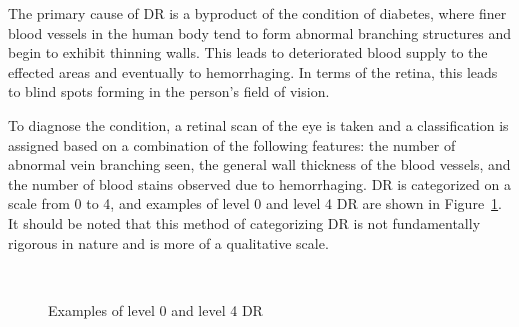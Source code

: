 \documentclass[letterpaper,12pt]{article}
\newcommand{\figref}[1]{Figure~\ref{#1}}
\begin{document}
The primary cause of DR is a byproduct of the condition of diabetes, where finer blood vessels in the human body tend to form abnormal branching structures and begin to exhibit thinning walls. This leads to deteriorated blood supply to the effected areas and eventually to hemorrhaging. In terms of the retina, this leads to blind spots forming in the person's field of vision. 

To diagnose the condition, a retinal scan of the eye is taken and a classification is assigned based on a combination of the following features: the number of abnormal vein branching seen, the general wall thickness of the blood vessels, and the number of blood stains observed due to hemorrhaging. DR is categorized on a scale from 0 to 4, and examples of level 0 and level 4 DR are shown in \figref{marking_image}. It should be noted that this method of categorizing DR is not fundamentally rigorous in nature and is more of a qualitative scale. 

\begin{figure}[htbp]
\begin{center}
  \ \ \ \ 
\caption{Examples of level 0 and level 4 DR}
\label{marking_image}
\end{center}
\end{figure}
\end{document}
